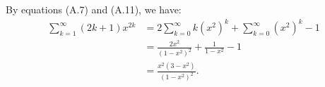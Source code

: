 By equations (A.7) and (A.11), we have:
\begin{align*}
    \sum_{k=1}^\infty(2k+1)x^{2k} &= 2\sum_{k=0}^\infty k(x^2)^k+\sum_{k=0}^\infty(x^2)^k-1 \\
    &= \frac{2x^2}{(1-x^2)^2}+\frac{1}{1-x^2}-1 \\[1mm]
    &= \frac{x^2(3-x^2)}{(1-x^2)^2}.
\end{align*}
